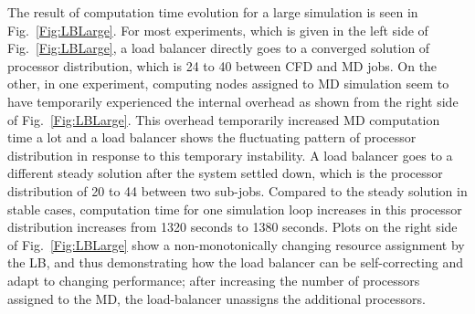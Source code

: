 \documentclass[conference,final]{IEEEtran}
\begin{document}
The result of computation time evolution for a large simulation is
seen in Fig.~\ref{Fig:LBLarge}. For most experiments, which is given in
the left side of Fig.~\ref{Fig:LBLarge}, a load balancer directly goes
to a converged solution of processor distribution, which is 24 to 40
between CFD and MD jobs. On the other, in one experiment, computing
nodes assigned to MD simulation seem to have temporarily experienced
the internal overhead as shown from the right side of
Fig.~\ref{Fig:LBLarge}. This overhead temporarily increased MD
computation time a lot and a load balancer shows the fluctuating
pattern of processor distribution in response to this temporary
instability. A load balancer goes to a different steady solution after
the system settled down, which is the processor distribution of 20 to
44 between two sub-jobs. Compared to the steady solution in stable
cases, computation time for one simulation loop increases in this
processor distribution increases from 1320 seconds to 1380
seconds. %
Plots on the right side of Fig.~\ref{Fig:LBLarge} show a
non-monotonically changing resource assignment by the LB, and thus
demonstrating how the load balancer can be self-correcting and adapt
to changing performance; after increasing the number of processors
assigned to the MD, the load-balancer unassigns the additional
processors.
\end{document}
